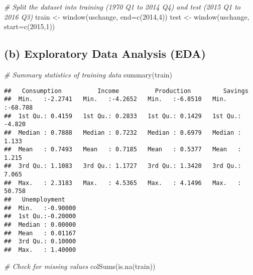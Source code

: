 \documentclass[
  12pt,
]{article}
\newenvironment{Shaded}{\begin{snugshade}}{\end{snugshade}}
\newcommand{\AttributeTok}[1]{\textcolor[rgb]{0.77,0.63,0.00}{#1}}
\newcommand{\CommentTok}[1]{\textcolor[rgb]{0.56,0.35,0.01}{\textit{#1}}}
\newcommand{\DecValTok}[1]{\textcolor[rgb]{0.00,0.00,0.81}{#1}}
\newcommand{\FunctionTok}[1]{\textcolor[rgb]{0.00,0.00,0.00}{#1}}
\newcommand{\NormalTok}[1]{#1}
\newcommand{\OtherTok}[1]{\textcolor[rgb]{0.56,0.35,0.01}{#1}}
\begin{document}
\begin{Shaded}
\begin{Highlighting}[]
\CommentTok{\# Split the dataset into training (1970 Q1 to 2014 Q4) and test (2015 Q1 to 2016 Q3)}
\NormalTok{train }\OtherTok{\textless{}{-}} \FunctionTok{window}\NormalTok{(uschange, }\AttributeTok{end=}\FunctionTok{c}\NormalTok{(}\DecValTok{2014}\NormalTok{,}\DecValTok{4}\NormalTok{))}
\NormalTok{test  }\OtherTok{\textless{}{-}} \FunctionTok{window}\NormalTok{(uschange, }\AttributeTok{start=}\FunctionTok{c}\NormalTok{(}\DecValTok{2015}\NormalTok{,}\DecValTok{1}\NormalTok{))}
\end{Highlighting}
\end{Shaded}

\hypertarget{b-exploratory-data-analysis-eda}{%
\subsection{(b) Exploratory Data Analysis
(EDA)}\label{b-exploratory-data-analysis-eda}}

\begin{Shaded}
\begin{Highlighting}[]
\CommentTok{\# Summary statistics of training data}
\FunctionTok{summary}\NormalTok{(train)}
\end{Highlighting}
\end{Shaded}

\begin{verbatim}
##   Consumption          Income          Production         Savings       
##  Min.   :-2.2741   Min.   :-4.2652   Min.   :-6.8510   Min.   :-68.788  
##  1st Qu.: 0.4159   1st Qu.: 0.2833   1st Qu.: 0.1429   1st Qu.: -4.820  
##  Median : 0.7888   Median : 0.7232   Median : 0.6979   Median :  1.133  
##  Mean   : 0.7493   Mean   : 0.7185   Mean   : 0.5377   Mean   :  1.215  
##  3rd Qu.: 1.1083   3rd Qu.: 1.1727   3rd Qu.: 1.3420   3rd Qu.:  7.065  
##  Max.   : 2.3183   Max.   : 4.5365   Max.   : 4.1496   Max.   : 50.758  
##   Unemployment     
##  Min.   :-0.90000  
##  1st Qu.:-0.20000  
##  Median : 0.00000  
##  Mean   : 0.01167  
##  3rd Qu.: 0.10000  
##  Max.   : 1.40000
\end{verbatim}

\begin{Shaded}
\begin{Highlighting}[]
\CommentTok{\# Check for missing values}
\FunctionTok{colSums}\NormalTok{(}\FunctionTok{is.na}\NormalTok{(train))}
\end{Highlighting}
\end{Shaded}
\end{document}
